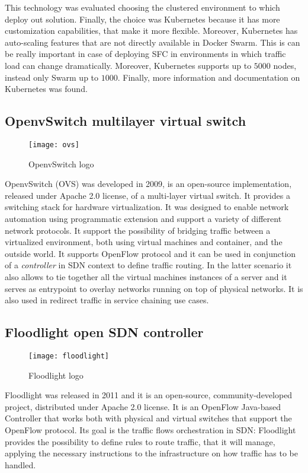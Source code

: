 This technology was evaluated choosing the clustered environment to which deploy
out solution. Finally, the choice was Kubernetes because it has more
customization capabilities, that make it more flexible. Moreover, Kubernetes has
auto-scaling features that are not directly available in Docker Swarm. This is
can be really important in case of deploying SFC in environments in which
traffic load can change dramatically. Moreover, Kubernetes supports up to $5000$
nodes, instead only Swarm up to $1000$. Finally, more information and
documentation on Kubernetes was found.

\subsection{OpenvSwitch multilayer virtual switch}
\begin{figure}[H]
 \centering \texttt{[image: ovs]}
 \caption{OpenvSwitch logo}
 \label{chap:prjan:img:ovs_logo}
\end{figure}
OpenvSwitch (OVS) was developed in 2009, is an open-source implementation,
released under Apache 2.0 license, of a multi-layer virtual switch. It provides
a switching stack for hardware virtualization. It was designed to enable network
automation using programmatic extension and support a variety of different
network protocols. It support the possibility of bridging traffic between a
virtualized environment, both using virtual machines and container, and the
outside world. It supports OpenFlow protocol and it can be used in conjunction
of a \emph{controller} in SDN context to define traffic routing. In the latter
scenario it also allows to tie together all the virtual machines instances
of a server and it serves as entrypoint to overlay networks running on top of
physical networks. It is also used in redirect traffic in service chaining use
cases.

\subsection{Floodlight open SDN controller}
\begin{figure}[H]
 \centering \texttt{[image: floodlight]}
 \caption{Floodlight logo}
 \label{chap:prjan:img:floodlight_logo}
\end{figure}
Floodlight was released in 2011 and it is an open-source, community-developed
project, distributed under Apache 2.0 license. It is an OpenFlow Java-based
Controller that works both with physical and virtual switches that support the
OpenFlow protocol. Its goal is the traffic flows orchestration in
SDN: Floodlight provides the possibility to define rules to route traffic, that
it will manage, applying the necessary instructions to the infrastructure on how
traffic has to be handled.

